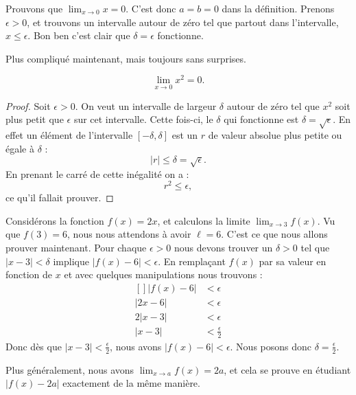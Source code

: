\begin{normaltext}
	Prouvons que \( \lim_{x\to 0}x=0\). C'est donc \( a=b=0\) dans la définition. Prenons \( \epsilon>0\), et trouvons un intervalle autour de zéro tel que partout dans l'intervalle, \( x\leq \epsilon\). Bon ben c'est clair que \( \delta=\epsilon\) fonctionne.
\end{normaltext}

Plus compliqué maintenant, mais toujours sans surprises.

\begin{proposition}
	\[
		\lim_{x\to 0}x^2=0.
	\]

\end{proposition}

\begin{proof}
	Soit \( \epsilon>0\). On veut un intervalle de largeur \( \delta\) autour de zéro tel que \( x^2\) soit plus petit que \( \epsilon\) sur cet intervalle. Cette fois-ci, le \( \delta\) qui fonctionne est \( \delta=\sqrt{\epsilon}\). En effet un élément de l'intervalle \( [-\delta,\delta]\) est un \( r\) de valeur absolue plus petite ou égale à \( \delta\) :
	\[
		| r |\leq\delta=\sqrt{\epsilon}.
	\]
	En prenant le carré de cette inégalité on a :
	\[
		r^2\leq\epsilon,
	\]
	ce qu'il fallait prouver.
\end{proof}

\begin{example}
	Considérons la fonction \( f(x)=2x\), et calculons la limite \( \lim_{x\to 3} f(x)\). Vu que \( f(3)=6\), nous nous attendons à avoir \( \ell=6\). C'est ce que nous allons prouver maintenant. Pour chaque \( \epsilon>0\) nous devons trouver un \( \delta>0\) tel que \( | x-3 |<\delta\) implique \( | f(x)-6 |<\epsilon\). En remplaçant \( f(x)\) par sa valeur en fonction de \( x\) et avec quelques manipulations nous trouvons :
	\begin{equation}
		\begin{aligned}[]
			| f(x)-6 | & <\epsilon             \\
			| 2x-6 |   & <\epsilon             \\
			2| x-3 |   & <\epsilon             \\
			| x-3 |    & <\frac{ \epsilon }{2}
		\end{aligned}
	\end{equation}
	Donc dès que \( | x-3 |<\frac{ \epsilon }{2}\), nous avons \( | f(x)-6 |<\epsilon\). Nous posons donc \( \delta=\frac{ \epsilon }{2}\).

	Plus généralement, nous avons \( \lim_{x\to a} f(x)=2a\), et cela se prouve en étudiant \( | f(x)-2a |\) exactement de la même manière.
\end{example}

